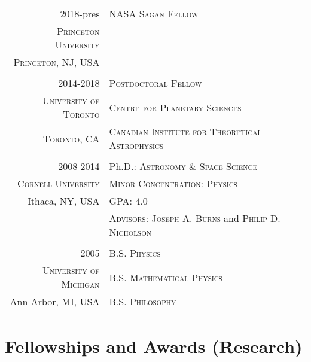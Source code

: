 \documentclass[10pt]{article} %
\begin{document}
\begin{tabular}{r|p{11cm}}
{2018-pres} & \textsc{NASA Sagan Fellow} \\
\textsc{Princeton University} & \\
 \textsc{Princeton, NJ, USA} &  \\

\multicolumn{2}{c}{} \\

{2014-2018} & \textsc{Postdoctoral Fellow} \\
\textsc{University of Toronto} & \textsc{Centre for Planetary Sciences} \\
\textsc{Toronto, CA} & \textsc{Canadian Institute for Theoretical Astrophysics} \\

\multicolumn{2}{c}{} \\

\textsc{2008-2014} & Ph.D.: \textsc{Astronomy \& Space Science} \\
\textsc{Cornell University} & \textsc{Minor Concentration}:  \textsc{Physics} \\
Ithaca, NY, USA & GPA: 4.0 \\ 
& \textsc{Advisors}: \textsc{Joseph A. Burns} and \textsc{Philip D. Nicholson}\\

\multicolumn{2}{c}{} \\


\textsc{2005} & \textsc{B.S. Physics} \\
\textsc{University of Michigan} & \textsc{B.S. Mathematical Physics} \\
Ann Arbor, MI, USA & \textsc{B.S. Philosophy} \\
\end{tabular}


\section{Fellowships and Awards (Research)}
\end{document}
